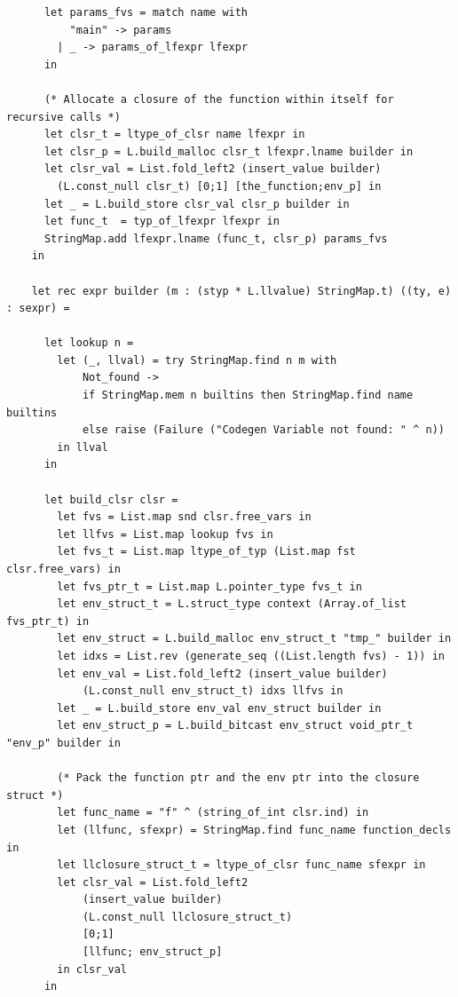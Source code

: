\documentclass[12pt]{article}
\begin{document}
\begin{mdframed}[hidealllines=true,backgroundcolor=blue!20]
\begin{lstlisting}
      let params_fvs = match name with
          "main" -> params
        | _ -> params_of_lfexpr lfexpr
      in

      (* Allocate a closure of the function within itself for recursive calls *)
      let clsr_t = ltype_of_clsr name lfexpr in
      let clsr_p = L.build_malloc clsr_t lfexpr.lname builder in
      let clsr_val = List.fold_left2 (insert_value builder) 
        (L.const_null clsr_t) [0;1] [the_function;env_p] in
      let _ = L.build_store clsr_val clsr_p builder in
      let func_t  = typ_of_lfexpr lfexpr in
      StringMap.add lfexpr.lname (func_t, clsr_p) params_fvs
    in

    let rec expr builder (m : (styp * L.llvalue) StringMap.t) ((ty, e) : sexpr) =

      let lookup n =
        let (_, llval) = try StringMap.find n m with
            Not_found ->
            if StringMap.mem n builtins then StringMap.find name builtins
            else raise (Failure ("Codegen Variable not found: " ^ n)) 
        in llval
      in

      let build_clsr clsr =
        let fvs = List.map snd clsr.free_vars in
        let llfvs = List.map lookup fvs in
        let fvs_t = List.map ltype_of_typ (List.map fst clsr.free_vars) in
        let fvs_ptr_t = List.map L.pointer_type fvs_t in
        let env_struct_t = L.struct_type context (Array.of_list fvs_ptr_t) in
        let env_struct = L.build_malloc env_struct_t "tmp_" builder in
        let idxs = List.rev (generate_seq ((List.length fvs) - 1)) in
        let env_val = List.fold_left2 (insert_value builder) 
            (L.const_null env_struct_t) idxs llfvs in
        let _ = L.build_store env_val env_struct builder in
        let env_struct_p = L.build_bitcast env_struct void_ptr_t "env_p" builder in

        (* Pack the function ptr and the env ptr into the closure struct *)
        let func_name = "f" ^ (string_of_int clsr.ind) in
        let (llfunc, sfexpr) = StringMap.find func_name function_decls in
        let llclosure_struct_t = ltype_of_clsr func_name sfexpr in
        let clsr_val = List.fold_left2 
            (insert_value builder) 
            (L.const_null llclosure_struct_t)
            [0;1] 
            [llfunc; env_struct_p]
        in clsr_val
      in


\end{lstlisting}
\end{mdframed}
\end{document}
